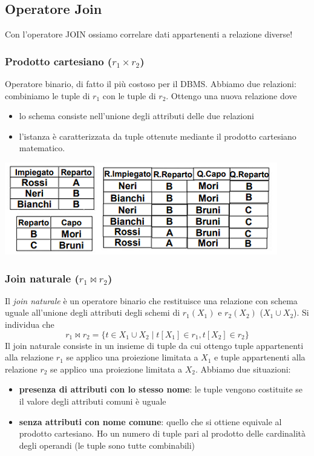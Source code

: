 \subsection{Operatore Join}
Con l'operatore JOIN ossiamo correlare dati appartenenti a relazione diverse!
\subsubsection{Prodotto cartesiano ($r_1 \times r_2$)}
Operatore binario, di fatto il più costoso per il DBMS. Abbiamo due relazioni: combiniamo le tuple di $r_1$ con le tuple di $r_2$. Ottengo una nuova relazione dove
\begin{itemize}
	\item lo schema consiste nell'unione degli attributi delle due relazioni
	\item l'istanza è caratterizzata da tuple ottenute mediante il prodotto cartesiano matematico.
\end{itemize}
\begin{center}
	\includegraphics{images/38.PNG}
\end{center}
\subsubsection{Join naturale ($r_1 \Join r_2$)}
Il \emph{join naturale} è un operatore binario che restituisce una relazione con schema uguale all'unione degli attributi degli schemi di $r_1(X_1)$ e $r_2(X_2)$ ($X_1 \cup X_2$). Si individua che 
\[r_1 \Join r_2=\{t \in X_1 \cup X_2\;|\; t[X_1] \in r_1, t[X_2] \in r_2\}\]
Il join naturale consiste in un insieme di tuple da cui ottengo tuple appartenenti alla relazione $r_1$ se applico una proiezione limitata a $X_1$ e tuple appartenenti alla relazione $r_2$ se applico una proiezione limitata a $X_2$.
Abbiamo due situazioni:
\begin{itemize}
	\item \textbf{presenza di attributi con lo stesso nome}: le tuple vengono costituite se il valore degli attributi comuni è uguale
	\item \textbf{senza attributi con nome comune}: quello che si ottiene equivale al prodotto cartesiano. Ho un numero di tuple pari al prodotto delle cardinalità degli operandi (le tuple sono tutte combinabili)
\end{itemize}
